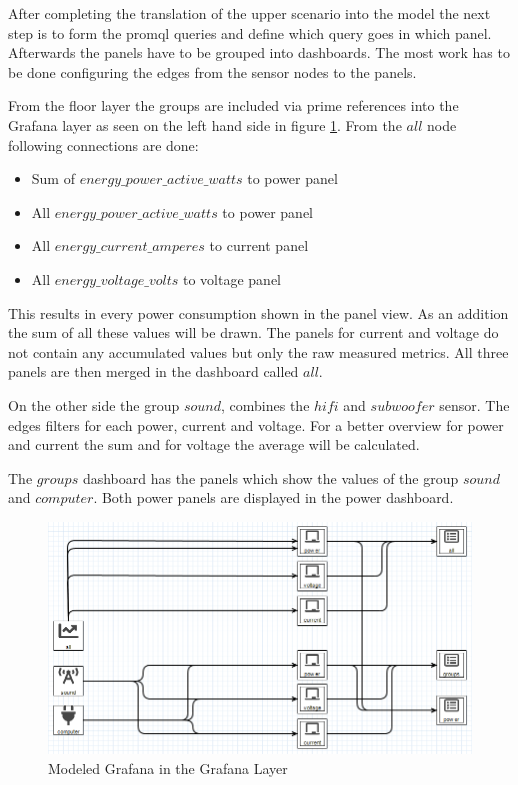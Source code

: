 After completing the translation of the upper scenario into the model the next step is to form the \gls{promql} queries and define which query goes in which panel. Afterwards the panels have to be grouped into dashboards. The most work has to be done configuring the edges from the sensor nodes to the panels.

From the floor layer the groups are included via prime references into the Grafana layer as seen on the left hand side in figure \ref{fig:modelGrafanaLayer}. From the $all$ node following connections are done:

\begin{itemize}
	\item Sum of $energy\_power\_active\_watts$ to power panel
	\item All $energy\_power\_active\_watts$ to power panel
	\item All $energy\_current\_amperes$ to current panel
 	\item All $energy\_voltage\_volts$ to voltage panel
\end{itemize}

This results in every power consumption shown in the panel view. As an addition the sum of all these values will be drawn. The panels for current and voltage do not contain any accumulated values but only the raw measured metrics. All three panels are then merged in the dashboard called $all$.

On the other side the group $sound$, combines the $hifi$ and $subwoofer$ sensor. The edges filters for each power, current and voltage. For a better overview for power and current the sum and for voltage the average will be calculated. 

The $groups$ dashboard has the panels which show the values of the group $sound$ and $computer$. Both power panels are displayed in the power dashboard.

\begin{figure}[!ht]
	\centering 
	\includegraphics[width=\linewidth]{assets/images/grafanaLayer}
	\caption{Modeled Grafana in the Grafana Layer}
	\label{fig:modelGrafanaLayer}
\end{figure}

